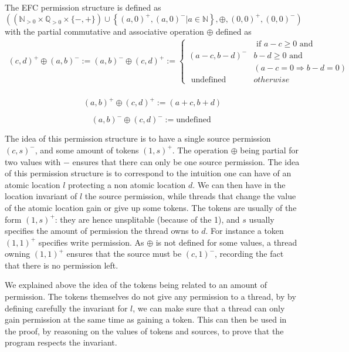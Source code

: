 The EFC permission structure is defined as 
\[\left(\left(\mathbb{N}_{>0} \times \mathbb{Q}_{>0} \times\{-,+\}\right) \cup\left\{(a, 0)^{+},(a, 0)^{-} | a \in \mathbb{N}\right\}, \oplus,(0,0)^{+},(0,0)^{-}\right)\]
with the partial commutative and associative operation $\oplus$ defined as 
\[\begin{array}{r}
{(c, d)^{+} \oplus(a, b)^{-} :=(a, b)^{-} \oplus(c, d)^{+} :=
\left\{\begin{array}{cl}
&{\text { if } a-c }{\geq 0 \text { and }} \\ 

{(a-c, b-d)^{-}} & {b-d }{\geq 0 \text { and }} 
\\ &({a-c}  {=0 \Rightarrow} {b-d}  {=0})\\

{\text { undefined }}&{{otherwise }}
\end{array}\right.} \\ 
\end{array}
\]
		
\[(a, b)^{+} \oplus(c, d)^{+} :=(a+c, b+d)\]

\[(a, b)^{-} \oplus(c, d)^{-} :=\text {undefined }\]

The idea of this permission structure is to have a single source permission $(c, s)^-$, and some amount of tokens $(1, s)^+$. The operation $\oplus$ being partial for two values with $-$ ensures that there can only be one source permission. The idea of this permission structure is to correspond to the intuition one can have of an atomic location $l$ protecting a non atomic location $d$. We can then have in the location invariant of $l$ the source permission, while threads that change the value of the atomic location gain or give up some tokens. The tokens are usually of the form $(1, s)^+$: they are hence unsplitable (because of the 1), and $s$ usually specifies the amount of permission the thread owns to $d$. For instance a token $(1, 1)^+$ specifies write permission. As $\oplus$ is not defined for some values, a thread owning $(1, 1)^+$ ensures that the source must be $(c, 1)^-$, recording the fact that there is no permission left.

We explained above the idea of the tokens being related to an amount of permission. The tokens themselves do not give any permission to a thread, by by defining carefully the invariant for $l$, we can make sure that a thread can only gain permission at the same time as gaining a token. This can then be used in the proof, by reasoning on the values of tokens and sources, to prove that the program respects the invariant.

